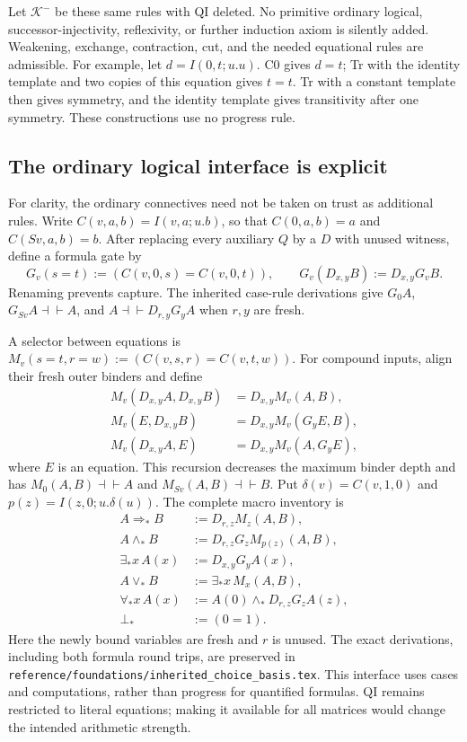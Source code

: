 \documentclass[11pt,letterpaper]{article}
\theoremstyle{definition}
\newcommand{\Km}{\mathcal K^{-}}
\newcommand{\file}[1]{{\small\nolinkurl{#1}}}
\begin{document}
Let $\Km$ be these same rules with QI deleted. No primitive ordinary
logical, successor-injectivity, reflexivity, or further induction axiom is
silently added. Weakening, exchange, contraction, cut, and the needed
equational rules are admissible. For example, let $d=I(0,t;u.u)$.
C0 gives $d=t$; Tr with the identity template and two copies of this
equation gives $t=t$. Tr with a constant template then gives symmetry,
and the identity template gives transitivity after one symmetry. These
constructions use no progress rule.

\subsection{The ordinary logical interface is explicit}

For clarity, the ordinary connectives need not be taken on trust as
additional rules. Write $C(v,a,b)=I(v,a;u.b)$, so that $C(0,a,b)=a$ and
$C(Sv,a,b)=b$. After replacing every auxiliary $Q$ by a $D$ with unused
witness, define a formula gate by
\[
G_v(s=t):=(C(v,0,s)=C(v,0,t)),\qquad
G_v(D_{x,y}B):=D_{x,y}G_vB.
\]
Renaming prevents capture. The inherited case-rule derivations give
$G_0A$, $G_{Sv}A\dashv\vdash A$, and
$A\dashv\vdash D_{r,y}G_yA$ when $r,y$ are fresh.

A selector between equations is
$M_v(s=t,r=w):=(C(v,s,r)=C(v,t,w))$.
For compound inputs, align their fresh outer binders and define
\[
\begin{aligned}
M_v(D_{x,y}A,D_{x,y}B)&=D_{x,y}M_v(A,B),\\
M_v(E,D_{x,y}B)&=D_{x,y}M_v(G_yE,B),\\
M_v(D_{x,y}A,E)&=D_{x,y}M_v(A,G_yE),
\end{aligned}
\]
where $E$ is an equation. This recursion decreases the maximum binder
depth and has $M_0(A,B)\dashv\vdash A$ and
$M_{Sv}(A,B)\dashv\vdash B$.
Put $\delta(v)=C(v,1,0)$ and $p(z)=I(z,0;u.\delta(u))$.
The complete macro inventory is
\[
\begin{aligned}
A\Rightarrow_*B&:=D_{r,z}M_z(A,B),\\
A\wedge_*B&:=D_{r,z}G_zM_{p(z)}(A,B),\\
\exists_*x\,A(x)&:=D_{x,y}G_yA(x),\\
A\vee_*B&:=\exists_*x\,M_x(A,B),\\
\forall_*x\,A(x)&:=A(0)\wedge_*D_{r,z}G_zA(z),\\
\bot_*&:=(0=1).
\end{aligned}
\]
Here the newly bound variables are fresh and $r$ is unused. The exact
derivations, including both formula round trips, are preserved in
\file{reference/foundations/inherited_choice_basis.tex}. This interface
uses cases and computations, rather than progress for quantified formulas.
QI remains restricted to literal equations; making it available for all
matrices would change the intended arithmetic strength.
\end{document}
